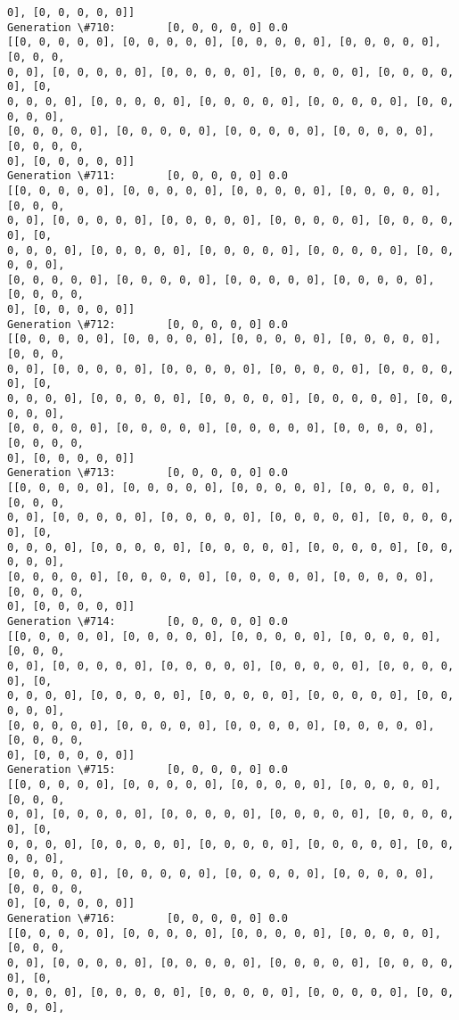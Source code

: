 \documentclass[11pt]{article}
\begin{document}
\begin{Verbatim}[commandchars=\\\{\}]
0], [0, 0, 0, 0, 0]]
Generation \#710:        [0, 0, 0, 0, 0] 0.0
[[0, 0, 0, 0, 0], [0, 0, 0, 0, 0], [0, 0, 0, 0, 0], [0, 0, 0, 0, 0], [0, 0, 0,
0, 0], [0, 0, 0, 0, 0], [0, 0, 0, 0, 0], [0, 0, 0, 0, 0], [0, 0, 0, 0, 0], [0,
0, 0, 0, 0], [0, 0, 0, 0, 0], [0, 0, 0, 0, 0], [0, 0, 0, 0, 0], [0, 0, 0, 0, 0],
[0, 0, 0, 0, 0], [0, 0, 0, 0, 0], [0, 0, 0, 0, 0], [0, 0, 0, 0, 0], [0, 0, 0, 0,
0], [0, 0, 0, 0, 0]]
Generation \#711:        [0, 0, 0, 0, 0] 0.0
[[0, 0, 0, 0, 0], [0, 0, 0, 0, 0], [0, 0, 0, 0, 0], [0, 0, 0, 0, 0], [0, 0, 0,
0, 0], [0, 0, 0, 0, 0], [0, 0, 0, 0, 0], [0, 0, 0, 0, 0], [0, 0, 0, 0, 0], [0,
0, 0, 0, 0], [0, 0, 0, 0, 0], [0, 0, 0, 0, 0], [0, 0, 0, 0, 0], [0, 0, 0, 0, 0],
[0, 0, 0, 0, 0], [0, 0, 0, 0, 0], [0, 0, 0, 0, 0], [0, 0, 0, 0, 0], [0, 0, 0, 0,
0], [0, 0, 0, 0, 0]]
Generation \#712:        [0, 0, 0, 0, 0] 0.0
[[0, 0, 0, 0, 0], [0, 0, 0, 0, 0], [0, 0, 0, 0, 0], [0, 0, 0, 0, 0], [0, 0, 0,
0, 0], [0, 0, 0, 0, 0], [0, 0, 0, 0, 0], [0, 0, 0, 0, 0], [0, 0, 0, 0, 0], [0,
0, 0, 0, 0], [0, 0, 0, 0, 0], [0, 0, 0, 0, 0], [0, 0, 0, 0, 0], [0, 0, 0, 0, 0],
[0, 0, 0, 0, 0], [0, 0, 0, 0, 0], [0, 0, 0, 0, 0], [0, 0, 0, 0, 0], [0, 0, 0, 0,
0], [0, 0, 0, 0, 0]]
Generation \#713:        [0, 0, 0, 0, 0] 0.0
[[0, 0, 0, 0, 0], [0, 0, 0, 0, 0], [0, 0, 0, 0, 0], [0, 0, 0, 0, 0], [0, 0, 0,
0, 0], [0, 0, 0, 0, 0], [0, 0, 0, 0, 0], [0, 0, 0, 0, 0], [0, 0, 0, 0, 0], [0,
0, 0, 0, 0], [0, 0, 0, 0, 0], [0, 0, 0, 0, 0], [0, 0, 0, 0, 0], [0, 0, 0, 0, 0],
[0, 0, 0, 0, 0], [0, 0, 0, 0, 0], [0, 0, 0, 0, 0], [0, 0, 0, 0, 0], [0, 0, 0, 0,
0], [0, 0, 0, 0, 0]]
Generation \#714:        [0, 0, 0, 0, 0] 0.0
[[0, 0, 0, 0, 0], [0, 0, 0, 0, 0], [0, 0, 0, 0, 0], [0, 0, 0, 0, 0], [0, 0, 0,
0, 0], [0, 0, 0, 0, 0], [0, 0, 0, 0, 0], [0, 0, 0, 0, 0], [0, 0, 0, 0, 0], [0,
0, 0, 0, 0], [0, 0, 0, 0, 0], [0, 0, 0, 0, 0], [0, 0, 0, 0, 0], [0, 0, 0, 0, 0],
[0, 0, 0, 0, 0], [0, 0, 0, 0, 0], [0, 0, 0, 0, 0], [0, 0, 0, 0, 0], [0, 0, 0, 0,
0], [0, 0, 0, 0, 0]]
Generation \#715:        [0, 0, 0, 0, 0] 0.0
[[0, 0, 0, 0, 0], [0, 0, 0, 0, 0], [0, 0, 0, 0, 0], [0, 0, 0, 0, 0], [0, 0, 0,
0, 0], [0, 0, 0, 0, 0], [0, 0, 0, 0, 0], [0, 0, 0, 0, 0], [0, 0, 0, 0, 0], [0,
0, 0, 0, 0], [0, 0, 0, 0, 0], [0, 0, 0, 0, 0], [0, 0, 0, 0, 0], [0, 0, 0, 0, 0],
[0, 0, 0, 0, 0], [0, 0, 0, 0, 0], [0, 0, 0, 0, 0], [0, 0, 0, 0, 0], [0, 0, 0, 0,
0], [0, 0, 0, 0, 0]]
Generation \#716:        [0, 0, 0, 0, 0] 0.0
[[0, 0, 0, 0, 0], [0, 0, 0, 0, 0], [0, 0, 0, 0, 0], [0, 0, 0, 0, 0], [0, 0, 0,
0, 0], [0, 0, 0, 0, 0], [0, 0, 0, 0, 0], [0, 0, 0, 0, 0], [0, 0, 0, 0, 0], [0,
0, 0, 0, 0], [0, 0, 0, 0, 0], [0, 0, 0, 0, 0], [0, 0, 0, 0, 0], [0, 0, 0, 0, 0],

\end{Verbatim}
\end{document}
